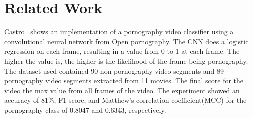 \newpage

\chapter{Related Work}
\label{chap:related}



Castro~\cite{torres2018automatic} shows an implementation of a pornography video classifier using a convolutional neural network from Open pornography\cite{mahadeokar2016open}.
The CNN does a logistic regression on each frame, resulting in a value from 0 to 1 at each frame.
The higher the value is, the higher is the likelihood of the frame being pornography.
The dataset used contained 90 non-pornography video segments and 89 pornography video segments extracted from 11 movies.
The final score for the video the max value from all frames of the video.
The experiment showed an accuracy of 81\%, F1-score, and Matthew’s correlation coefficient(MCC) for the pornography class of 0.8047 and 0.6343, respectively.

